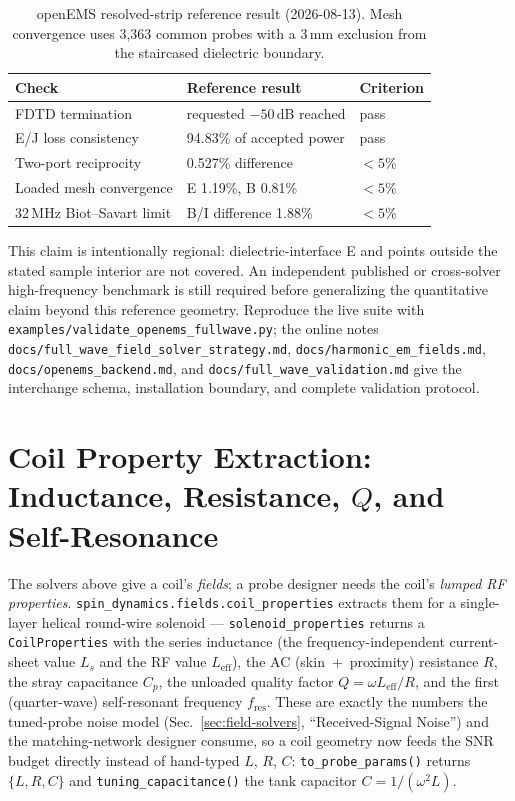 \documentclass[11pt,oneside]{report}
\newcommand{\code}[1]{\texttt{#1}}
\begin{document}
\begin{table}[h]
\centering
\small
\begin{tabular}{@{}lll@{}}
\toprule
Check & Reference result & Criterion \\
\midrule
FDTD termination & requested \(-50\)\,dB reached & pass \\
E/J loss consistency & 94.83\% of accepted power & pass \\
Two-port reciprocity & 0.527\% difference & \(<5\)\% \\
Loaded mesh convergence & E 1.19\%, B 0.81\% & \(<5\)\% \\
32\,MHz Biot--Savart limit & B/I difference 1.88\% & \(<5\)\% \\
\bottomrule
\end{tabular}
\caption{openEMS resolved-strip reference result (2026-08-13). Mesh convergence
uses 3,363 common probes with a 3\,mm exclusion from the staircased dielectric
boundary.}
\label{tab:openems-fullwave-validation}
\end{table}

This claim is intentionally regional: dielectric-interface E and points outside
the stated sample interior are not covered. An independent published or
cross-solver high-frequency benchmark is still required before generalizing the
quantitative claim beyond this reference geometry. Reproduce the live suite with
\code{examples/validate\_openems\_fullwave.py}; the online notes
\code{docs/full\_wave\_field\_solver\_strategy.md},
\code{docs/harmonic\_em\_fields.md}, \code{docs/openems\_backend.md}, and
\code{docs/full\_wave\_validation.md} give the interchange schema, installation
boundary, and complete validation protocol.

\section{Coil Property Extraction: Inductance, Resistance, \texorpdfstring{$Q$}{Q}, and Self-Resonance}
\label{sec:fields-coil-properties}

The solvers above give a coil's \emph{fields}; a probe designer needs the coil's
\emph{lumped RF properties}. \code{spin\_dynamics.fields.coil\_properties} extracts
them for a single-layer helical round-wire solenoid ---
\code{solenoid\_properties} returns a \code{CoilProperties} with the series
inductance (the frequency-independent current-sheet value \(L_s\) and the RF value
\(L_{\text{eff}}\)), the AC (skin~+~proximity) resistance \(R\), the stray
capacitance \(C_p\), the unloaded quality factor \(Q=\omega L_{\text{eff}}/R\), and
the first (quarter-wave) self-resonant frequency \(f_{\text{res}}\). These are exactly
the numbers the tuned-probe noise model (Sec.~\ref{sec:field-solvers}, ``Received-Signal
Noise'') and the matching-network designer consume, so a coil geometry now feeds the
SNR budget directly instead of hand-typed \(L\), \(R\), \(C\):
\code{to\_probe\_params()} returns \(\{L,R,C\}\) and \code{tuning\_capacitance()} the
tank capacitor \(C=1/(\omega^2 L)\).
\end{document}
